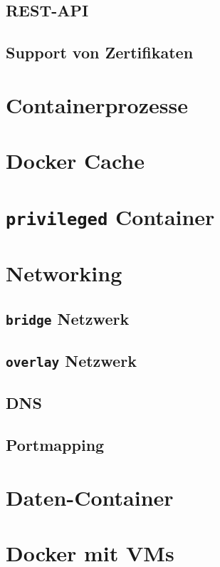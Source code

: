 \documentclass[../main.tex]{subfiles}
\begin{document}
		\subsection{\acrshort{REST}-\acrshort{API}}
		\subsection{Support von Zertifikaten}
  \section{Containerprozesse}
	\section{Docker Cache}
	\section{\texttt{privileged} Container}


	\section{Networking}
		\subsection{\texttt{bridge} Netzwerk}
		\subsection{\texttt{overlay} Netzwerk}
		\subsection{DNS}
		\subsection{Portmapping}
	\section{Daten-Container}
	\section{Docker mit \acrshort{VM}s}
\end{document}
